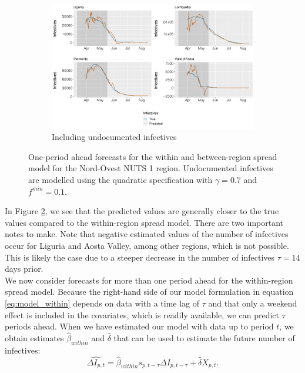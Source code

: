 \documentclass[12pt]{article}
\begin{document}
    \begin{figure}[H]\ContinuedFloat
	    \begin{subfigure}{\textwidth}
	      \centering
	      \includegraphics[width=0.94\linewidth]{output/model_between_lag14_forecast_start20_Nord-Ovest_UndocQuadratic_rolling.pdf}
	      \caption{Including undocumented infectives}
	      \label{fig:forecast_between_nordovest_undoc}
	    \end{subfigure}
	    \caption{One-period ahead forecasts for the within and between-region spread model for the Nord-Ovest NUTS 1 region. Undocumented infectives are modelled using the quadratic specification with $\gamma = 0.7$ and $f^{min}=0.1$.}
	    \label{fig:forecast_between_nordovest}
    \end{figure}
	
	In Figure \ref{fig:forecast_between_nordovest}, we see that the predicted values are generally closer to the true values compared to the within-region spread model. There are two important notes to make. Note that negative estimated values of the number of infectives occur for Liguria and Aosta Valley, among other regions, which is not possible. This is likely the case due to a steeper decrease in the number of infectives $\tau = 14$ days prior.
	\\
	
	We now consider forecasts for more than one period ahead for the within-region spread model. Because the right-hand side of our model formulation in equation \eqref{eq:model_within} depends on data with a time lag of $\tau$ and that only a weekend effect is included in the covariates, which is readily available, we can predict $\tau$ periods ahead. When we have estimated our model with data up to period $t$, we obtain estimates $\widehat{\beta}_{within}$ and $\widehat{\delta}$ that can be used to estimate the future number of infectives:
	    \[\widehat{\Delta I_{p,t}} = \widehat{\beta}_{within} s_{p,t-\tau} \Delta I_{p,t-\tau} + \widehat{\delta} X_{p,t}.\]
	    
\end{document}
